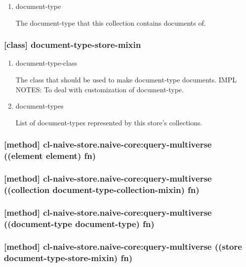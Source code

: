\documentclass[11pt]{article}
\begin{document}
\begin{enumerate}
\item\relax [accessor] document-type
\label{sec:org7c28956}

The document-type that this collection contains documents of.
\end{enumerate}


\subsubsection{[class] document-type-store-mixin}
\label{sec:org3e16b3b}

\begin{enumerate}
\item\relax [accessor] document-type-class
\label{sec:org558477f}

The class that should be used to make document-type documents.
IMPL NOTES: To deal with customization of document-type.

\item\relax [accessor] document-types
\label{sec:org887d81a}

List of document-types represented by this store's collections.
\end{enumerate}

\subsubsection{[method] cl-naive-store.naive-core:query-multiverse ((element element) fn)}
\label{sec:org77a9853}

\subsubsection{[method] cl-naive-store.naive-core:query-multiverse ((collection document-type-collection-mixin) fn)}
\label{sec:org1398f54}

\subsubsection{[method] cl-naive-store.naive-core:query-multiverse ((document-type document-type) fn)}
\label{sec:org1065c82}

\subsubsection{[method] cl-naive-store.naive-core:query-multiverse ((store document-type-store-mixin) fn)}
\label{sec:org59b760c}
\end{document}
